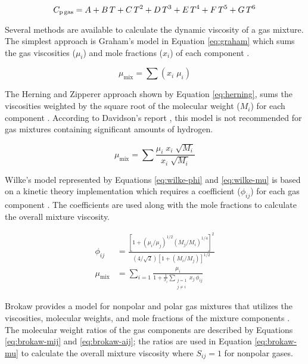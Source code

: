 \begin{equation}\label{eq:heatcap}
    C_\text{p\,gas} = A + B\,T + C\,T^2 + D\,T^3 + E\,T^4 + F\,T^5 + G\,T^6
\end{equation}

Several methods are available to calculate the dynamic viscosity of a gas mixture. The simplest approach is Graham's model in Equation \ref{eq:graham} which sums the gas viscosities ($\mu_i$) and mole fractions ($x_i$) of each component \cite{Graham-1846}.

\begin{equation}
    \mu_\text{mix} = \sum(x_i \; \mu_i)
    \label{eq:graham}
\end{equation}

The Herning and Zipperer approach shown by Equation \ref{eq:herning}, sums the viscosities weighted by the square root of the molecular weight ($M_i$) for each component \cite{Herning-1936}. According to Davidson's report \cite{Davidson-1993}, this model is not recommended for gas mixtures containing significant amounts of hydrogen.

\begin{equation}
    \mu_\text{mix} = \sum \frac{\mu_i \; x_i \; \sqrt{M_i}}{x_i \; \sqrt{M_i}}
    \label{eq:herning}
\end{equation}

Wilke's model represented by Equations \ref{eq:wilke-phi} and \ref{eq:wilke-mu} is based on a kinetic theory implementation which requires a coefficient ($\phi_{ij}$) for each gas component \cite{Wilke-1950}. The coefficients are used along with the mole fractions to calculate the overall mixture viscosity.

\begin{align}
    \phi_{ij} &= \frac{\left[1 + (\mu_i/\mu_j)^{1/2} (M_j/M_i)^{1/4}\right]^2}{(4/\sqrt{2}) \left[1 + (M_i/M_j)\right]^{1/2}} \label{eq:wilke-phi} \\
    \mu_{\text{mix}} &= \sum_{i=1} \frac{\mu_i}{1 + \frac{1}{x_i} \sum_{\substack{j=1 \\j \neq i}} x_j \, \phi_{ij}} \label{eq:wilke-mu}
\end{align}

Brokaw provides a model for nonpolar and polar gas mixtures that utilizes the viscosities, molecular weights, and mole fractions of the mixture components \cite{Brokaw-1968}. The molecular weight ratios of the gas components are described by Equations \ref{eq:brokaw-mij} and \ref{eq:brokaw-aij}; the ratios are used in Equation \ref{eq:brokaw-mu} to calculate the overall mixture viscosity where $S_{ij} = 1$ for nonpolar gases.

